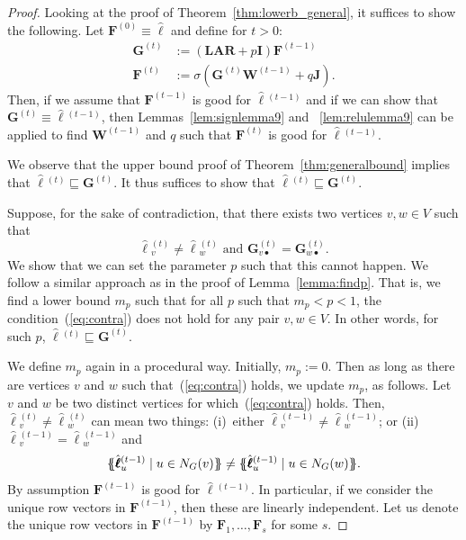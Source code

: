 \begin{proof}
Looking at the proof of Theorem~\ref{thm:lowerb_general}, it suffices to show the following. Let $\mathbf{F}^{(0)}\equiv\hat{\pmb{\ell}}$ and define for $t>0$:
\begin{align*}
\mathbf{G}^{(t)}&:=(\mathbf{L}\mathbf{A}\mathbf{R}+p\mathbf{I})\mathbf{F}^{(t-1)}\\
\mathbf{F}^{(t)}&:=\sigma(\mathbf{G}^{(t)}\mathbf{W}^{(t-1)}+q\mathbf{J}).
\end{align*}
Then, if we assume that $\mathbf{F}^{(t-1)}$ is good for $\hat{\pmb{\ell}}{}^{(t-1)}$ and if we can show that $\mathbf{G}^{(t)}\equiv \hat{\pmb{\ell}}{}^{(t-1)}$, then 
Lemmas~\ref{lem:signlemma9} and
~\ref{lem:relulemma9} can be applied to find $\mathbf{W}^{(t-1)}$ and $q$ such that $\mathbf{F}^{(t)}$ is good for  $\hat{\pmb{\ell}}{}^{(t-1)}$.

We observe that the upper bound proof of Theorem~\ref{thm:generalbound}  implies that  $\hat{\pmb{\ell}}{}^{(t)}\sqsubseteq \mathbf{G}^{(t)}$. It thus suffices to show that $\hat{\pmb{\ell}}{}^{(t)}\sqsubseteq \mathbf{G}^{(t)}$.


Suppose, for the sake of contradiction, that there exists two vertices $v,w\in V$ such that 
\begin{equation}
\hat{\pmb{\ell}}{}^{(t)}_v\neq\hat{\pmb{\ell}}{}^{(t)}_w \text{ and }
\mathbf{G}^{(t)}_{v\bullet}=\mathbf{G}^{(t)}_{w\bullet}. \label{eq:contra}
\end{equation} We show that we can set the parameter $p$ such that this cannot happen. We follow a similar approach as in the proof of Lemma~\ref{lemma:findp}. That is, we find a lower bound $m_p$ such that for all $p$ such that $m_p<p<1$, the condition~(\ref{eq:contra}) does not hold for any pair $v,w\in V$. In other words, for such $p$,  $\hat{\pmb{\ell}}{}^{(t)}\sqsubseteq \mathbf{G}^{(t)}$.

We define $m_p$ again in a procedural way. Initially, $m_p:=0$. Then as long as there are vertices $v$ and $w$ such that~(\ref{eq:contra}) holds, we update $m_p$, as follows. Let $v$ and $w$ be two distinct vertices for which~(\ref{eq:contra}) holds.
Then, $\hat{\pmb{\ell}}{}^{(t)}_v\neq\hat{\pmb{\ell}}{}^{(t)}_w$ can mean two things: (i)~either $\hat{\pmb{\ell}}{}^{(t-1)}_v\neq\hat{\pmb{\ell}}{}^{(t-1)}_w$;
or (ii)~~$\hat{\pmb{\ell}}{}^{(t-1)}_v=\hat{\pmb{\ell}}{}^{(t-1)}_w$ and
$$
\ldbl \hat{\pmb{\ell}}{}^{(t-1)}_{u} \st u \in N_G(v) \rdbl\neq
\ldbl \hat{\pmb{\ell}}{}^{(t-1)}_{u} \st u \in N_G(w) \rdbl.
$$
By assumption $\mathbf{F}^{(t-1)}$ is good for $\hat{\pmb{\ell}}{}^{(t-1)}$.
In particular, if we consider the unique row vectors in  $\mathbf{F}^{(t-1)}$, then these are linearly independent. Let us denote the unique row vectors in $\mathbf{F}^{(t-1)}$ by $\mathbf{F}_1,\ldots,\mathbf{F}_s$ for some $s$.


\end{proof}
